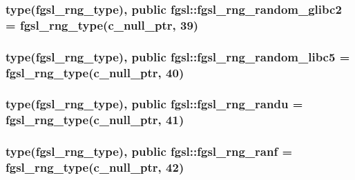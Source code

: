 \hypertarget{classfgsl_aa5b21e91890ada1ae4bef30981f67da1}{
\subsubsection[{fgsl\-\_\-rng\-\_\-random\-\_\-glibc2}]{\setlength{\rightskip}{0pt plus 5cm}type({\bf fgsl\-\_\-rng\-\_\-type}), public fgsl\-::fgsl\-\_\-rng\-\_\-random\-\_\-glibc2 = {\bf fgsl\-\_\-rng\-\_\-type}(c\-\_\-null\-\_\-ptr, 39)}}\label{classfgsl_aa5b21e91890ada1ae4bef30981f67da1}
\hypertarget{classfgsl_a642018575871b9b658058f7540ffce03}{
\subsubsection[{fgsl\-\_\-rng\-\_\-random\-\_\-libc5}]{\setlength{\rightskip}{0pt plus 5cm}type({\bf fgsl\-\_\-rng\-\_\-type}), public fgsl\-::fgsl\-\_\-rng\-\_\-random\-\_\-libc5 = {\bf fgsl\-\_\-rng\-\_\-type}(c\-\_\-null\-\_\-ptr, 40)}}\label{classfgsl_a642018575871b9b658058f7540ffce03}
\hypertarget{classfgsl_a27e0ade0cf0e6155c944ca520547c4a8}{
\subsubsection[{fgsl\-\_\-rng\-\_\-randu}]{\setlength{\rightskip}{0pt plus 5cm}type({\bf fgsl\-\_\-rng\-\_\-type}), public fgsl\-::fgsl\-\_\-rng\-\_\-randu = {\bf fgsl\-\_\-rng\-\_\-type}(c\-\_\-null\-\_\-ptr, 41)}}\label{classfgsl_a27e0ade0cf0e6155c944ca520547c4a8}
\hypertarget{classfgsl_a40a3682ade652628973e925312f78240}{
\subsubsection[{fgsl\-\_\-rng\-\_\-ranf}]{\setlength{\rightskip}{0pt plus 5cm}type({\bf fgsl\-\_\-rng\-\_\-type}), public fgsl\-::fgsl\-\_\-rng\-\_\-ranf = {\bf fgsl\-\_\-rng\-\_\-type}(c\-\_\-null\-\_\-ptr, 42)}}\label{classfgsl_a40a3682ade652628973e925312f78240}
